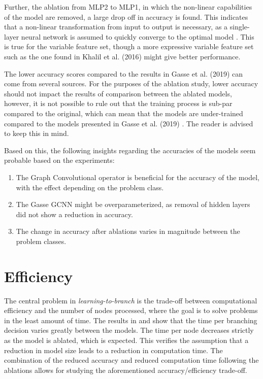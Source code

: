 Further, the ablation from MLP2 to MLP1, in which the non-linear capabilities of the model are removed, a large drop off in accuracy is found. This indicates that a non-linear transformation from input to output is necessary, as a single-layer neural network is assumed to quickly converge to the optimal model \cite{goodfellow2016deep}. This is true for the variable feature set, though a more expressive variable feature set such as the one found in Khalil et al. (2016) \cite{khalil2016learning} might give better performance.



The lower accuracy scores compared to the results in Gasse et al. (2019) \cite{gasse2019exact} can come from several sources. For the purposes of the ablation study, lower accuracy should not impact the results of comparison between the ablated models, however, it is not possible to rule out that the training process is sub-par compared to the original, which can mean that the models are under-trained compared to the models presented in Gasse et al. (2019) \cite{gasse2019exact}. The reader is advised to keep this in mind. 



Based on this, the following insights regarding the accuracies of the models seem probable based on the experiments:
\begin{enumerate}[label=(\roman*)]
    \item The Graph Convolutional operator is beneficial for the accuracy of the model, with the effect depending on the problem class.
    \item The Gasse GCNN might be overparameterized, as removal of hidden layers did not show a reduction in accuracy.
    \item The change in accuracy after ablations varies in magnitude between the problem classes.
\end{enumerate}


\section{Efficiency}\label{sec:disc_efficiency}



The central problem in \textit{learning-to-branch} is the trade-off between computational efficiency and the number of nodes processed, where the goal is to solve problems in the least amount of time. The results in  and  show that the time per branching decision varies greatly between the models. The time per node decreases strictly as the model is ablated, which is expected. This verifies the assumption that a reduction in model size leads to a reduction in computation time. The combination of the reduced accuracy and reduced computation time following the ablations allows for studying the aforementioned accuracy/efficiency trade-off. 

